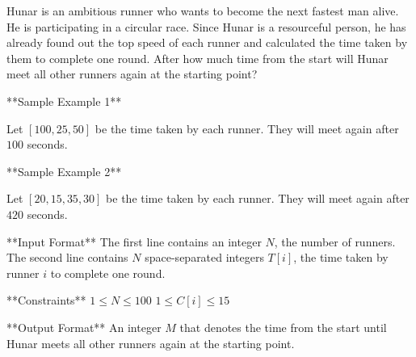 Hunar is an ambitious runner who wants to become the next fastest man alive. He is participating in a circular race. Since Hunar is a resourceful person, he has already found out the top speed of each runner and calculated the time taken by them to complete one round. After how much time from the start will Hunar meet all other runners again at the starting point?

**Sample Example 1**  

Let $[100, 25, 50]$ be the time taken by each runner. They will meet again after $100$ seconds.

**Sample Example 2**  

Let $[20, 15, 35, 30]$ be the time taken by each runner. They will meet again after $420$ seconds.

**Input Format**  
The first line contains an integer $N$, the number of runners.  
The second line contains $N$ space-separated integers $T[i]$, the time taken by runner $i$ to complete one round.


**Constraints**  
$1 \leq N \leq 100$  
$1 \leq C[i] \leq 15$


**Output Format**  
An integer $M$ that denotes the time from the start until Hunar meets all other runners again at the starting point.
